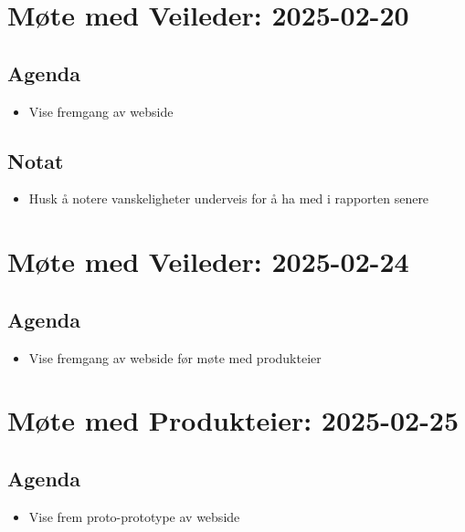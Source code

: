 \section*{Møte med Veileder: 2025-02-20}

\subsection*{Agenda}

\begin{itemize}
\item
  Vise fremgang av webside
\end{itemize}

\subsection*{Notat}

\begin{itemize}
    \item Husk å notere vanskeligheter underveis for å ha med i rapporten senere
\end{itemize}

\section*{Møte med Veileder: 2025-02-24}

\subsection*{Agenda}
\begin{itemize}
\item
  Vise fremgang av webside før møte med produkteier
\end{itemize}


\section*{Møte med Produkteier: 2025-02-25}

\subsection*{Agenda}

\begin{itemize}
\item
  Vise frem proto-prototype av webside
\end{itemize}

